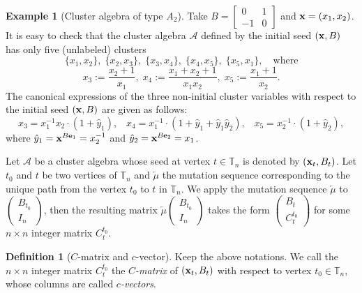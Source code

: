 \documentclass[10pt]{amsart}
\theoremstyle{definition}
\newtheorem{definition}[theorem]{Definition}
\newtheorem{example}[theorem]{Example}
\theoremstyle{remark}
\numberwithin{equation}{section}
\begin{document}
\begin{example}[Cluster algebra of type $A_2$]
\label{ex:A2}
   Take $B=\begin{bmatrix}
    0&1\\-1&0
\end{bmatrix}$ and ${\bf x}=(x_1,x_2)$. 
It is easy to  check that the  cluster algebra $\mathcal A$ defined by the initial seed $({\bf x}, B)$  has only five (unlabeled) clusters \[\{x_1,x_2\},\;\{x_2,x_3\},\;\{x_3,x_4\},\;\{x_4,x_5\},\;\{x_5,x_1\},\quad \text{where}\]
\[x_3:=   \frac{x_2+1}{x_1}, \;x_4:=   \frac{x_1+x_2+1}{x_1x_2}, \;x_5:=  \frac{x_1+1}{x_2}.\]
The canonical expressions of the three non-initial cluster variables with respect to the initial seed $({\bf x}, B)$ are given as follows:
    \[x_3={x_1^{-1}x_2\cdot(1+\widehat y_1),}\;\;\;  x_4={x_1^{-1}\cdot (1+\widehat y_1+\widehat y_1\widehat y_2),}\;\;\;
    x_5={x_2^{-1}\cdot (1+\widehat y_2)},\]
    where ${\hat y}_1={\bf x}^{B{\bf e}_1}=x_2^{-1}$ and ${\hat y}_2={\bf x}^{B{\bf e}_2}=x_1$.
\end{example}



Let $\mathcal A$ be a cluster algebra whose seed at vertex $t\in\mathbb T_n$ is denoted by $({\bf x}_t,B_t)$. Let $t_0$ and $t$ be two vertices of $\mathbb T_n$ and $\overleftarrow{\mu}$ the mutation sequence corresponding to the unique path from the vertex $t_0$ to $t$ in $\mathbb T_n$.
 We apply the mutation sequence $\overleftarrow{\mu}$ to $\begin{pmatrix} B_{t_0}\\ I_{n}\end{pmatrix}$, then the
 resulting matrix $\overleftarrow{\mu}\begin{pmatrix} B_{t_0}\\ I_{n}\end{pmatrix}$ takes the form $\begin{pmatrix} B_t\\  C_t^{t_0}\end{pmatrix}$ for some $n\times n$ integer matrix $C_{t}^{t_0}$.
 
 \begin{definition}[$C$-matrix and $c$-vector]
 Keep the above notations. We call the $n\times n$ integer matrix $C_t^{t_0}$ the {\em $C$-matrix} of $({\bf x}_t, B_t)$ with respect to vertex $t_0\in\mathbb T_n$, whose columns are called {\em $c$-vectors}.
\end{definition}
 
\end{document}
